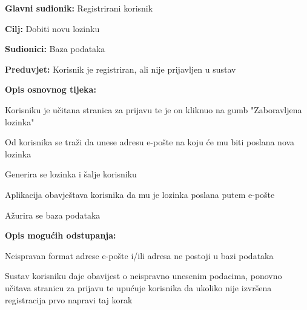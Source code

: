 				\noindent {}
				\begin{packed_item}
					
					\item \textbf{Glavni sudionik: } Registrirani korisnik
					\item  \textbf{Cilj:} Dobiti novu lozinku
					\item  \textbf{Sudionici:} Baza podataka
					\item  \textbf{Preduvjet:} Korisnik je registriran, ali nije prijavljen u sustav
					\item  \textbf{Opis osnovnog tijeka:}
					
					\item[] \begin{packed_enum}
				
						\item Korisniku je učitana stranica za prijavu te je on kliknuo na gumb "Zaboravljena lozinka"
						\item Od korisnika se traži da unese adresu e-pošte na koju će mu biti poslana nova lozinka
						\item Generira se lozinka i šalje korisniku
						\item Aplikacija obavještava korisnika da mu je lozinka poslana putem e-pošte
						\item Ažurira se baza podataka
						
					\end{packed_enum}
					
					\item  \textbf{Opis mogućih odstupanja:}
					
					\item[] \begin{packed_item}
						
						\item[2.a]  Neispravan format adrese e-pošte i/ili adresa ne postoji u bazi podataka
						\item[] \begin{packed_enum}
							
							\item Sustav korisniku daje obavijest o neispravno unesenim podacima, ponovno učitava stranicu za prijavu te upućuje korisnika da ukoliko nije izvršena registracija prvo napravi taj korak
							
						\end{packed_enum}
						
					\end{packed_item}
					
				\end{packed_item}
